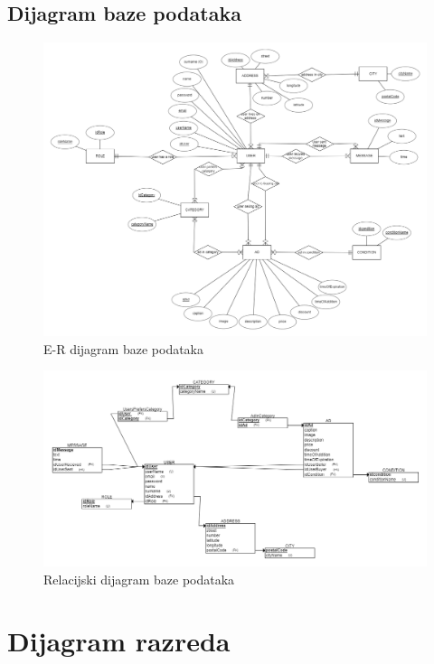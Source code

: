 			
			\subsection{Dijagram baze podataka}
			
				\begin{figure}[H]
			\includegraphics[scale=0.3]{slike/DatabaseER.PNG} %
			\centering
			\caption{E-R dijagram baze podataka}
			\label{fig:dijagramBaze1}
		\end{figure}
	
	\begin{figure}[H]
		\includegraphics[scale=0.4]{slike/DijagramBaze.PNG} %
		\centering
		\caption{Relacijski dijagram baze podataka}
		\label{fig:dijagramBaze2}
	\end{figure}
			\eject
			
		\section{Dijagram razreda}
		

